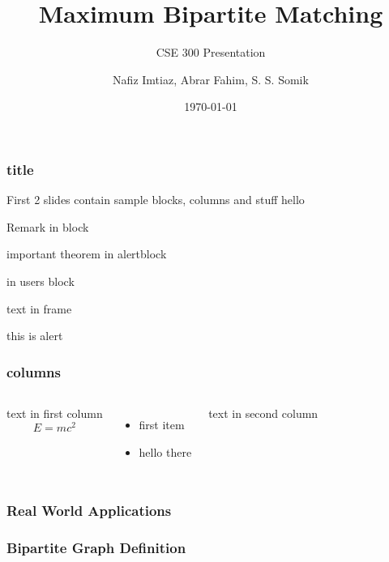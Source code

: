 \documentclass[10pt]{beamer}
\begin{document}
\title{Maximum Bipartite Matching}
\author{Nafiz Imtiaz, Abrar Fahim, S. S. Somik}
\date{\today}
\subtitle{CSE 300 Presentation}

\begin{frame}
    \frametitle{title}
    
	First 2 slides contain sample blocks, columns and stuff
	hello
    
    \begin{block}{Remark}
    in block
    \end{block}
    
    \begin{alertblock}{important theorem}
    in alertblock
    \end{alertblock}
    
    \begin{examples} 
    in users block
    \end{examples}
    
    text in frame
    
    \alert{this is alert}


\end{frame}

\begin{frame}
	\frametitle{columns}
	\begin{columns}
		text in first column
		 $$E = mc^2$$
		\begin{itemize}
			
			\item first item
			\item hello there
		\end{itemize}
		
		text in second column
	\end{columns}
\end{frame}

\begin{frame}
	\frametitle{Real World Applications}
	
	\begin{itemize}
	\end{itemize}
	
\end{frame}

\frame{\titlepage}

\begin{frame}
	\frametitle{Bipartite Graph Definition}
	
\end{frame}
\end{document}
